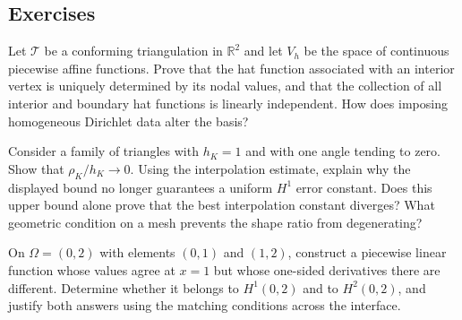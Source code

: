 \subsection*{Exercises}
\begin{exercises}

    \ex Let $\mathcal T$ be a conforming triangulation in $\mathbb R^2$ and let $V_h$ be the
    space of continuous piecewise affine functions. Prove that the hat
    function associated with an interior vertex is uniquely determined by its
    nodal values, and that the collection of all interior and boundary hat
    functions is linearly independent. How does imposing homogeneous
    Dirichlet data alter the basis?

    \ex Consider a family of triangles with $h_K=1$ and with one angle tending
    to zero. Show that $\rho_K/h_K\to0$. Using the interpolation estimate,
    explain why the displayed bound no longer guarantees a uniform $H^1$ error constant.
    Does this upper bound alone prove that the best interpolation constant diverges?
    What geometric condition on a mesh prevents the shape ratio from degenerating?

    \ex On $\Omega=(0,2)$ with elements $(0,1)$ and $(1,2)$, construct a
    piecewise linear function whose values agree at $x=1$ but whose one-sided
    derivatives there are different. Determine whether it belongs to
    $H^1(0,2)$ and to $H^2(0,2)$, and justify both answers using the matching
    conditions across the interface.
\end{exercises}

\printbibliography[heading=subbibliography]
